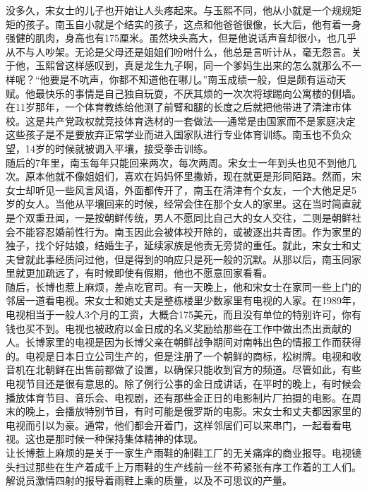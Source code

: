 \begin{multicols}{\theparacolNo}
没多久，宋女士的儿子也开始让人头疼起来。与玉熙不同，他从小就是一个规规矩矩的孩子。南玉自小就是个结实的孩子，这点和他爸爸很像，长大后，他有着一身强健的肌肉，身高也有175厘米。虽然块头高大，但是他说话声音却很小，也几乎从不与人吵架。无论是父母还是姐姐们吩咐什么，他总是言听计从，毫无怨言。关于他，玉熙曾这样感叹到，真是龙生九子啊，同一个爹妈生出来的怎么就那么不一样呢？“他要是不吭声，你都不知道他在哪儿。”南玉成绩一般，但是颇有运动天赋。他最快乐的事情是自己独自玩耍，不厌其烦的一次次将球踢向公寓楼的侧墙。在11岁那年，一个体育教练给他测了前臂和腿的长度之后就把他带进了清津市体校。这是共产党政权就竞技体育选材的一套做法──通常是由国家而不是家庭决定这些孩子是不是要放弃正常学业而进入国家队进行专业体育训练。南玉也不负众望，14岁的时候就被调入平壤，接受拳击训练。\\

随后的7年里，南玉每年只能回来两次，每次两周。宋女士一年到头也见不到他几次。原本他就不像姐姐们，喜欢在妈妈怀里撒娇，现在就更是形同陌路。然而，宋女士却听见一些风言风语，外面都传开了，南玉在清津有个女友，一个大他足足5岁的女人。当他从平壤回来的时候，经常会住在那个女人的家里。这在当时简直就是个双重丑闻，一是按朝鲜传统，男人不愿同比自己大的女人交往，二则是朝鲜社会不能容忍婚前性行为。南玉因此会被体校开除的，或被逐出共青团。作为家里的独子，找个好姑娘，结婚生子，延续家族是他责无旁贷的重任。就此，宋女士和丈夫曾就此事经质问过他，但是得到的响应只是死一般的沉默。从那以后，南玉同家里就更加疏远了，有时候即使有假期，他也不愿意回家看看。\\

随后，长博也惹上麻烦，差点吃官司。有一天晚上，他和宋女士在家同一些上门的邻居一道看电视。宋女士和她丈夫是整栋楼里少数家里有电视的人家。在1989年，电视相当于一般人3个月的工资，大概合175美元，而且没有单位的特别许可，你有钱也买不到。电视也被政府以金日成的名义奖励给那些在工作中做出杰出贡献的人。长博家里的电视是因为长博父亲在朝鲜战争期间对南韩出色的情报工作而获得的。电视是日本日立公司生产的，但是注册了一个朝鲜的商标，松树牌。电视和收音机在北朝鲜在出售前都做了设置，以确保只能收到官方的频道。尽管如此，有些电视节目还是很有意思的。除了例行公事的金日成讲话，在平时的晚上，有时候会播放体育节目、音乐会、电视剧，还有那些金正日的电影制片厂拍摄的电影。在周末的晚上，会播放特别节目，有时可能是俄罗斯的电影。宋女士和丈夫都因家里的电视而引以为豪。通常，他们都会开着门，这样邻居们可以来串门，一起看看电视。这也是那时候一种保持集体精神的体现。\\

让长博惹上麻烦的是关于一家生产雨鞋的制鞋工厂的无关痛痒的商业报导。电视镜头扫过那些在生产着成千上万雨鞋的生产线前一丝不苟紧张有序工作着的工人们。解说员激情四射的报导着雨鞋上乘的质量，以及不可思议的产量。\\


\end{multicols}
